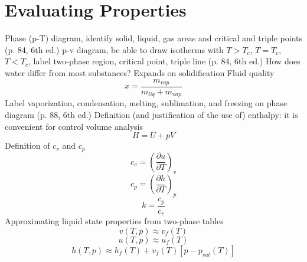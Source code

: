 \documentclass[paper=letter, fontsize=11pt]{scrartcl}
\numberwithin{equation}{section}        %
\numberwithin{figure}{section}          %
\numberwithin{table}{section}               %
\begin{document}
\newpage
\section{Evaluating Properties}

Phase (p-T) diagram, identify solid, liquid, gas areas and critical and triple points (p. 84, 6th ed.)
\newline
\newline
p-v diagram, be able to draw isotherms with $T>T_c$, $T=T_c$, $T<T_c$, label two-phase region, critical point, triple line (p. 84, 6th ed.)
\newline
\newline
How does water differ from most substances? Expands on solidification
\newline
\newline
Fluid quality 
\begin{equation}
    x = \frac{m_{vap}}{m_{liq}+m_{vap}}
\end{equation}
\newline
\newline
Label vaporization, condensation, melting, sublimation, and freezing on phase diagram (p. 88, 6th ed.)
\newline
\newline
Definition (and justification of the use of) enthalpy: it is convenient for control volume analysis
\begin{equation}
    H=U+pV
\end{equation}
\newline
\newline
Definition of $c_v$ and $c_p$ 
\begin{equation}
    c_v = \left(\frac{\partial u}{\partial T}\right)_v
\end{equation}
\begin{equation}
    c_p = \left(\frac{\partial h}{\partial T}\right)_p
\end{equation}
\begin{equation}
    k = \frac{c_p}{c_v}
\end{equation}
\newline
\newline
Approximating liquid state properties from two-phase tables
\begin{equation}
    v(T,p)\approx v_f(T)
\end{equation}
\begin{equation}
    u(T,p)\approx u_f(T)
\end{equation}
\begin{equation}
    h(T,p)\approx h_f(T) + v_f(T)[p-p_{sat}(T)]
\end{equation}
\end{document}
